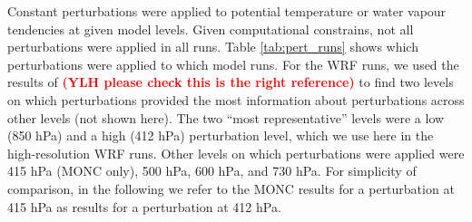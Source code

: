 \documentclass[draft]{agujournal2019}
\newcommand{\todo}[1]{\textcolor{red}{\textbf{(#1)}}}
\begin{document}
Constant perturbations were applied to potential temperature or water vapour
tendencies at given model levels. Given computational constrains, not all
perturbations were applied in all runs.  Table \ref{tab:pert_runs} shows which
perturbations were applied to which model runs. For the WRF runs, we used the
results of \cite{Hwong_JAMES_2021} \todo{YLH please check this is the right
reference} to find two levels on which perturbations provided the most
information about perturbations across other levels (not shown here). The two
``most representative'' levels were a low (850 hPa) and a high (412 hPa)
perturbation level, which we use here in the high-resolution WRF runs. Other
levels on which perturbations were applied were 415 hPa (MONC only), 500 hPa,
600 hPa, and 730 hPa. For simplicity of comparison, in the following we refer to
the MONC results for a perturbation at 415 hPa as results for a perturbation at
412 hPa.
\end{document}
